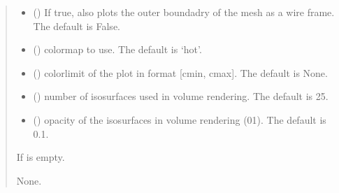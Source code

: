 \documentclass[letterpaper,10pt,english]{sphinxmanual}
\begin{document}
\begin{fulllineitems}
\begin{fulllineitems}
\begin{quote}
\begin{description}
\begin{itemize}
\item {} 
\sphinxAtStartPar
{} (\sphinxstyleliteralemphasis{\sphinxupquote{, }}) \textendash{} If true, also plots the outer boundadry of the mesh as a wire frame. The default is False.

\item {} 
\sphinxAtStartPar
{} (\sphinxstyleliteralemphasis{\sphinxupquote{, }}) \textendash{} colormap to use. The default is ‘hot’.

\item {} 
\sphinxAtStartPar
{} (\sphinxstyleliteralemphasis{\sphinxupquote{, }}) \textendash{} colorlimit of the plot in format {[}cmin, cmax{]}. The default is None.

\item {} 
\sphinxAtStartPar
{} (\sphinxstyleliteralemphasis{\sphinxupquote{, }}) \textendash{} number of isosurfaces used in volume rendering. The default is 25.

\item {} 
\sphinxAtStartPar
{} (\sphinxstyleliteralemphasis{\sphinxupquote{, }}) \textendash{} opacity of the isosurfaces in volume rendering (0\sphinxhyphen{}1). The default is 0.1.

\end{itemize}

\sphinxAtStartPar
{} \textendash{} If  is empty.

\sphinxAtStartPar
None.

\end{description}\end{quote}

\end{fulllineitems}


\end{fulllineitems}
\end{document}

